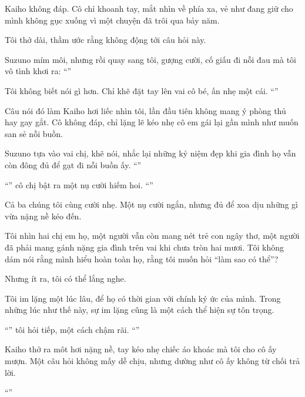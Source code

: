 \documentclass[../main.tex]{subfiles}
\begin{document}
Kaiho không đáp. Cô chỉ khoanh tay, mắt nhìn về phía xa, vẻ như đang giữ cho mình không gục xuống vì một chuyện đã trôi qua bảy năm.

Tôi thở dài, thầm ước rằng không động tới câu hỏi này.

Suzuno mím môi, nhưng rồi quay sang tôi, gượng cười, cố giấu đi nỗi đau mà tôi vô tình khơi ra: ``''

Tôi không biết nói gì hơn. Chỉ khẽ đặt tay lên vai cô bé, ấn nhẹ một cái. ``''

Câu nói đó làm Kaiho hơi liếc nhìn tôi, lần đầu tiên không mang ý phòng thủ hay gay gắt. Cô không đáp, chỉ lặng lẽ kéo nhẹ cô em gái lại gần mình như muốn san sẻ nỗi buồn.

Suzuno tựa vào vai chị, khẽ nói, nhắc lại những kỷ niệm đẹp khi gia đình họ vẫn còn đông đủ để gạt đi nỗi buồn ấy. ``''

``'' cô chị bật ra một nụ cười hiếm hoi. ``''

Cả ba chúng tôi cùng cười nhẹ. Một nụ cười ngắn, nhưng đủ để xoa dịu những gì vừa nặng nề kéo đến.

Tôi nhìn hai chị em họ, một người vẫn còn mang nét trẻ con ngây thơ, một người đã phải mang gánh nặng gia đình trên vai khi chưa tròn hai mươi. Tôi không dám nói rằng mình hiểu hoàn toàn họ, rằng tôi muốn hỏi ``làm sao có thể''?

Nhưng ít ra, tôi có thể lắng nghe.

Tôi im lặng một lúc lâu, để họ có thời gian với chính ký ức của mình. Trong những lúc như thế này, sự im lặng cũng là một cách thể hiện sự tôn trọng.

``'' tôi hỏi tiếp, một cách chậm rãi. ``''

Kaiho thở ra môt hơi nặng nề, tay kéo nhẹ chiếc áo khoác mà tôi cho cô ấy mượn. Một câu hỏi không mấy dễ chịu, nhưng dường như cô ấy không từ chối trả lời.

``''
\end{document}
